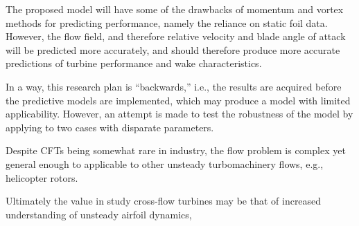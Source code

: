 The proposed model will have some of the drawbacks of momentum and vortex
methods for predicting performance, namely the reliance on static foil data.
However, the flow field, and therefore relative velocity and blade angle of
attack will be predicted more accurately, and should therefore produce more
accurate predictions of turbine performance and wake characteristics.

In a way, this research plan is ``backwards,'' i.e., the results are acquired
before the predictive models are implemented, which may produce a model with
limited applicability. However, an attempt is made to test the robustness of the
model by applying to two cases with disparate parameters.

Despite CFTs being somewhat rare in industry, the flow problem is complex yet
general enough to applicable to other unsteady turbomachinery flows, e.g.,
helicopter rotors.

Ultimately the value in study cross-flow turbines may be that of increased understanding of unsteady airfoil dynamics, 